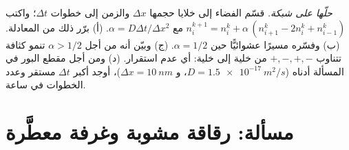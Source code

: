 \begin{exercise}[$\star\star\star$]\label{exo:b2:particle-diffusion:12}
\emph{حلّها على شبكة.} قسّم الفضاء إلى خلايا حجمها $\Delta x$
والزمن إلى خطوات $\Delta t$؛ واكتب $n_i^{k+1} = n_i^k + \alpha\,(n_{i+1}^k
- 2n_i^k + n_{i-1}^k)$ مع $\alpha = D\Delta t/\Delta x^2$. (أ) برّر
ذلك من المعادلة. (ب) وفسّره مسيرًا عشوائيًّا حين $\alpha =
1/2$. (ج) وبيّن أنه من أجل $\alpha > 1/2$ تنمو كثافة تتناوب $+,-,+,-$
من خلية إلى خلية: أي عدم استقرار. (د) ومن أجل مقطع البور في
المسألة أدناه ($D = \qty{1.5e-17}{m^2/s}$، و $\Delta x = \qty{10}{nm}$)،
أوجد أكبر $\Delta t$ مستقر وعدد الخطوات في ساعة.
\end{exercise}

\section{مسألة: رقاقة مشوبة وغرفة معطَّرة}

